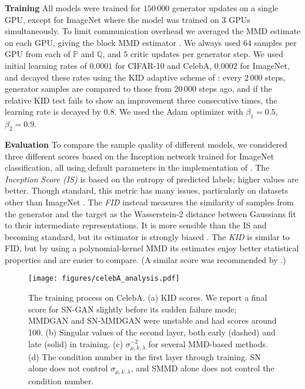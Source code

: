\documentclass{article}
\newcommand{\PP}{\mathbb P}
\newcommand{\QQ}{\mathbb Q}
\begin{document}
\textbf{Training}
All models were trained for $150\,000$ generator updates on a single GPU,
except for ImageNet where the model was trained on 3 GPUs simultaneously.
To limit communication overhead we averaged the MMD estimate on each GPU,
giving the block MMD estimator \parencite{b-test}.
We always used $64$ samples per GPU from each of $\PP$ and $\QQ$,
and $5$ critic updates per generator step.
We used initial learning rates of $0.0001$ for CIFAR-10 and CelebA,
$0.0002$ for ImageNet,
and decayed these rates using the KID adaptive scheme of \cite{Binkowski:2018}:
every $2\,000$ steps, generator samples are compared to those from $20\,000$ steps ago,
and if the relative KID test \parencite{3sample} fails to show an improvement three consecutive times,
the learning rate is decayed by $0.8$.
We used the Adam optimizer \parencite{adam} with $\beta_1 = 0.5$, $\beta_2 = 0.9$.


\textbf{Evaluation}
To compare the sample quality of different models,
we considered three different scores
based on the Inception network \parencite{inception} trained for ImageNet classification,
all using default parameters in the implementation of \cite{Binkowski:2018}.
The \emph{Inception Score (IS)} \parencite{improved-gans}
is based on the entropy of predicted labels;
higher values are better.
Though standard, this metric has many issues,
particularly on datasets other than ImageNet \parencite{note-on-inception,fid,Binkowski:2018}.
The \emph{FID} \parencite{fid}
instead measures the similarity of samples from the generator and the target
as the Wasserstein-2 distance between Gaussians fit to
their intermediate representations.
It is more sensible than the IS and becoming standard,
but its estimator is strongly biased \parencite{Binkowski:2018}.
The \emph{KID} \parencite{Binkowski:2018}
is similar to FID,
but by using a polynomial-kernel MMD its estimates enjoy better statistical properties
and are easier to compare.
(A similar score was recommended by \cite{empirical-evaluation}.)





 \begin{figure}[p]
  \centering
    \texttt{[image: figures/celebA\_analysis.pdf]}
    \caption{The training process on CelebA.
      (a) KID scores. We report a final score for SN-GAN slightly before its sudden failure mode;
          MMDGAN and SN-MMDGAN were unstable and had scores around 100.
      (b) Singular values of the second layer, both early (dashed) and late (solid) in training.
      (c) $\sigma_{\mu,k,\lambda}^{-2}$ for several MMD-based methods.
      (d) The condition number in the first layer through training.
      SN alone does not control $\sigma_{\mu,k,\lambda}$,
      and SMMD alone does not control the condition number.
    }
    \label{fig:celebA_scores_and_singular_values}
 \end{figure}
\end{document}
